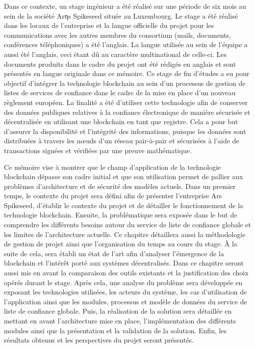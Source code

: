 \documentclass{tnreport}
\begin{document}
Dans ce contexte, un stage ingénieur a été réalisé sur une période de six mois au sein de la société Arηs Spikeseed située au Luxembourg. 
Le stage a été réalisé dans les locaux de l'entreprise et la langue officielle du projet pour les communications avec les autres membres du consortium (mails, documents, conférences téléphoniques) a été l’anglais. La langue utilisée au sein de l'équipe a aussi été l'anglais, ceci étant dû au caractère multinational de celle-ci. Les documents produits dans le cadre du projet ont été rédigés en anglais et sont présentés en langue originale dans ce mémoire.
Ce stage de fin d'études a eu pour objectif d'intégrer la technologie blockchain au sein d'un processus de gestion de listes de services de confiance dans le cadre de la mise en place d'un nouveau règlement européen. 
La finalité a été d'utiliser cette technologie afin de conserver des données publiques relatives à la confiance électronique de manière sécurisée et décentralisée en utilisant une blockchain en tant que registre.
Cela a pour but d'assurer la disponibilité et l'intégrité des informations, puisque les données sont distribuées à travers les nœuds d'un réseau pair-à-pair et sécurisées à l'aide de transactions signées et vérifiées par une preuve mathématique. 


Ce mémoire vise à montrer que le champ d'application de la technologie blockchain dépasse son cadre initial et que son utilisation permet de pallier aux problèmes d'architecture et de sécurité des modèles actuels. 
Dans un premier temps, le contexte du projet sera défini afin de présenter l'entreprise Ar{\texteta}s Spikeseed, d'établir le contexte du projet et de détailler le fonctionnement de la technologie blockchain.
Ensuite, la problématique sera exposée dans le but de comprendre les différents besoins autour du service de liste de confiance globale et les limites de l'architecture actuelle. Ce chapitre détaillera aussi la méthodologie de gestion de projet ainsi que l'organisation du temps au cours du stage.
À la suite de cela, sera établi un état de l'art afin d'analyser l'émergence de la blockchain et l'intérêt porté aux systèmes décentralisés. Dans ce chapitre seront aussi mis en avant la comparaison des outils existants et la justification des choix opérés durant le stage. 
Après cela, une analyse du problème sera développée en exposant les technologies utilisées, les acteurs du système, les cas d'utilisation de l'application ainsi que les modules, processus et modèle de données du service de liste de confiance globale.
Puis, la réalisation de la solution sera détaillée en mettant en avant l'architecture mise en place, l'implémentation des différents modules ainsi que la présentation et la validation de la solution.
Enfin, les résultats obtenus et les perspectives du projet seront présentés.
\end{document}
